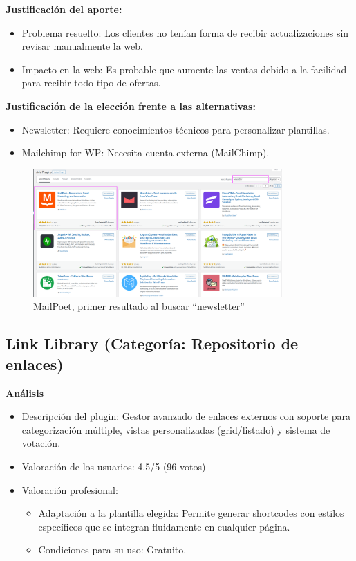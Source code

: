 \documentclass[a4paper]{article}
\begin{document}
\textbf{Justificación del aporte:}
\begin{itemize}
    \item Problema resuelto: Los clientes no tenían forma de recibir actualizaciones sin revisar manualmente la web.
    \item Impacto en la web: Es probable que aumente las ventas debido a la facilidad para recibir todo tipo de ofertas.
\end{itemize}
    

\textbf{Justificación de la elección frente a las alternativas:}
\begin{itemize}
    \item Newsletter: Requiere conocimientos técnicos para personalizar plantillas.
    \item Mailchimp for WP: Necesita cuenta externa (MailChimp).
\end{itemize}

\begin{figure}[H]
    \centering
    \includegraphics[width=0.85\textwidth]{images/popularidad-mailpoet.png}
    \caption{MailPoet, primer resultado al buscar ``newsletter''}
\end{figure}


\subsection{Link Library (Categoría: Repositorio de enlaces)}

\textbf{Análisis}
\begin{itemize}
    \item Descripción del plugin: Gestor avanzado de enlaces externos con soporte para categorización múltiple, vistas personalizadas (grid/listado) y sistema de votación.
    \item Valoración de los usuarios: 4.5/5 (96 votos)
    \item Valoración profesional:
    \begin{itemize}
        \item Adaptación a la plantilla elegida: Permite generar shortcodes con estilos específicos que se integran fluidamente en cualquier página.
        \item Condiciones para su uso: Gratuito.
    \end{itemize}
\end{itemize}
\end{document}
